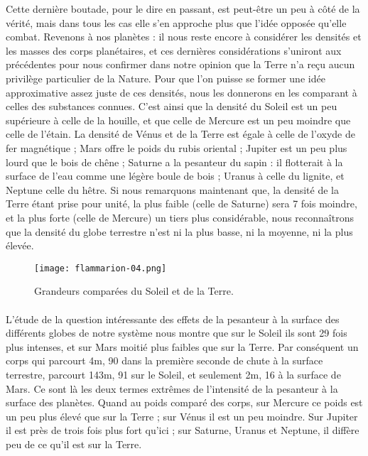 \documentclass[a4paper, 11pt, oneside]{article}
\begin{document}
Cette dernière boutade, pour le dire en passant, est peut-être un peu à côté de la vérité, mais dans tous les cas elle s'en approche plus que l'idée opposée qu'elle combat. Revenons à nos planètes : il nous reste encore à considérer les densités et les masses des corps planétaires, et ces dernières considérations s'uniront aux précédentes pour nous confirmer dans notre opinion que la Terre n'a reçu aucun privilège particulier de la Nature. Pour que l'on puisse se former une idée approximative assez juste de ces densités, nous les donnerons en les comparant à celles des substances connues. C'est ainsi que la densité du Soleil est un peu supérieure à celle de la houille, et que celle de Mercure est un peu moindre que celle de l'étain. La densité de Vénus et de la Terre est égale à celle de l'oxyde de fer magnétique ; Mars offre le poids du rubis oriental ; Jupiter est un peu plus lourd que le bois de chêne ; Saturne a la pesanteur du sapin : il flotterait à la surface de l'eau comme une légère boule de bois ; Uranus à celle du lignite, et Neptune celle du hêtre. Si nous remarquons maintenant que, la densité de la Terre étant prise pour unité, la plus faible (celle de Saturne) sera 7 fois moindre, et la plus forte (celle de Mercure) un tiers plus considérable, nous reconnaîtrons que la densité du globe terrestre n'est ni la plus basse, ni la moyenne, ni la plus élevée.
\clearpage
\vspace*{\fill}
\begin{figure}[H]
\centering
\texttt{[image: flammarion-04.png]}
\caption{Grandeurs comparées du Soleil et de la Terre.}
\end{figure}
\vspace*{\fill}
\clearpage
\paragraph{}
L'étude de la question intéressante des effets de la pesanteur à la surface des différents globes de notre système nous montre que sur le Soleil ils sont 29 fois plus intenses, et sur Mars moitié plus faibles que sur la Terre. Par conséquent un corps qui parcourt 4m, 90 dans la première seconde de chute à la surface terrestre, parcourt 143m, 91 sur le Soleil, et seulement 2m, 16 à la surface de Mars. Ce sont là les deux termes extrêmes de l'intensité de la pesanteur à la surface des planètes. Quand au poids comparé des corps, sur Mercure ce poids est un peu plus élevé que sur la Terre ; sur Vénus il est un peu moindre. Sur Jupiter il est près de trois fois plus fort qu'ici ; sur Saturne, Uranus et Neptune, il diffère peu de ce qu'il est sur la Terre.
\end{document}
